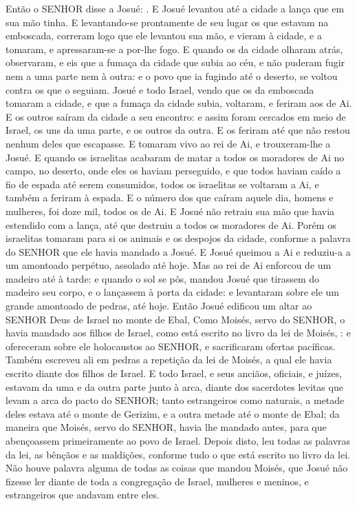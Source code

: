 {Então o SENHOR disse a Josué: . E Josué levantou até a cidade a lança que em sua mão tinha.
E levantando-se prontamente de seu lugar os que estavam na emboscada, correram logo que ele levantou sua mão, e vieram à cidade, e a tomaram, e apressaram-se a por-lhe fogo.
E quando os da cidade olharam atrás, observaram, e eis que a fumaça da cidade que subia ao céu, e não puderam fugir nem a uma parte nem à outra: e o povo que ia fugindo até o deserto, se voltou contra os que o seguiam.
Josué e todo Israel, vendo que os da emboscada tomaram a cidade, e que a fumaça da cidade subia, voltaram, e feriram aos de Ai.
E os outros saíram da cidade a seu encontro: e assim foram cercados em meio de Israel, os uns da uma parte, e os outros da outra. E os feriram até que não restou nenhum deles que escapasse.
E tomaram vivo ao rei de Ai, e trouxeram-lhe a Josué.
E quando os israelitas acabaram de matar a todos os moradores de Ai no campo, no deserto, onde eles os haviam perseguido, e que todos haviam caído a fio de espada até serem consumidos, todos os israelitas se voltaram a Ai, e também a feriram à espada.
E o número dos que caíram aquele dia, homens e mulheres, foi doze mil, todos os de Ai.
E Josué não retraiu sua mão que havia estendido com a lança, até que destruiu a todos os moradores de Ai.
Porém os israelitas tomaram para si os animais e os despojos da cidade, conforme a palavra do SENHOR que ele havia mandado a Josué.
E Josué queimou a Ai e reduziu-a a um amontoado perpétuo, assolado até hoje.
Mas ao rei de Ai enforcou de um madeiro até à tarde: e quando o sol se pôs, mandou Josué que tirassem do madeiro seu corpo, e o lançassem à porta da cidade: e levantaram sobre ele um grande amontoado de pedras, até hoje.
Então Josué edificou um altar ao SENHOR Deus de Israel no monte de Ebal,
Como Moisés, servo do SENHOR, o havia mandado aos filhos de Israel, como está escrito no livro da lei de Moisés, : e ofereceram sobre ele holocaustos ao SENHOR, e sacrificaram ofertas pacíficas.
Também escreveu ali em pedras a repetição da lei de Moisés, a qual ele havia escrito diante dos filhos de Israel.
E todo Israel, e seus anciãos, oficiais, e juízes, estavam da uma e da outra parte junto à arca, diante dos sacerdotes levitas que levam a arca do pacto do SENHOR; tanto estrangeiros como naturais, a metade deles estava até o monte de Gerizim, e a outra metade até o monte de Ebal; da maneira que Moisés, servo do SENHOR, havia lhe mandado antes, para que abençoassem primeiramente ao povo de Israel.
Depois disto, leu todas as palavras da lei, as bênçãos e as maldições, conforme tudo o que está escrito no livro da lei.
Não houve palavra alguma de todas as coisas que mandou Moisés, que Josué não fizesse ler diante de toda a congregação de Israel, mulheres e meninos, e estrangeiros que andavam entre eles.

\par }

